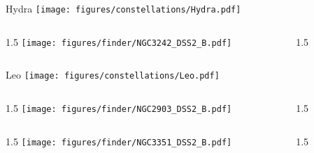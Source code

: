 \documentclass[final]{beamer}
\newlength{\colwidth}
\begin{document}

\begin{frame}[t]{\LARGE Hydra}
  \centering
  \texttt{[image: figures/constellations/Hydra.pdf]}
\end{frame}


\begin{frame}[t]{}
  \begin{columns}[T]
    \begin{column}{1.5\colwidth}
      \centering
      \texttt{[image: figures/finder/NGC3242\_DSS2\_B.pdf]}
    \end{column}
    \begin{column}{1.5\colwidth}
      \Large
      
    \end{column}
  \end{columns}
  \vspace{\fill}
\end{frame}


\begin{frame}[t]{\LARGE Leo}
  \centering
  \texttt{[image: figures/constellations/Leo.pdf]}
\end{frame}


\begin{frame}[t]{}
  \begin{columns}[T]
    \begin{column}{1.5\colwidth}
      \centering
      \texttt{[image: figures/finder/NGC2903\_DSS2\_B.pdf]}
    \end{column}
    \begin{column}{1.5\colwidth}
      \Large
      
    \end{column}
  \end{columns}
  \vspace{\fill}
  \begin{columns}[T]
    \begin{column}{1.5\colwidth}
      \centering
      \texttt{[image: figures/finder/NGC3351\_DSS2\_B.pdf]}
    \end{column}
    \begin{column}{1.5\colwidth}
      \Large
      
    \end{column}
  \end{columns}
\end{frame}
\end{document}
